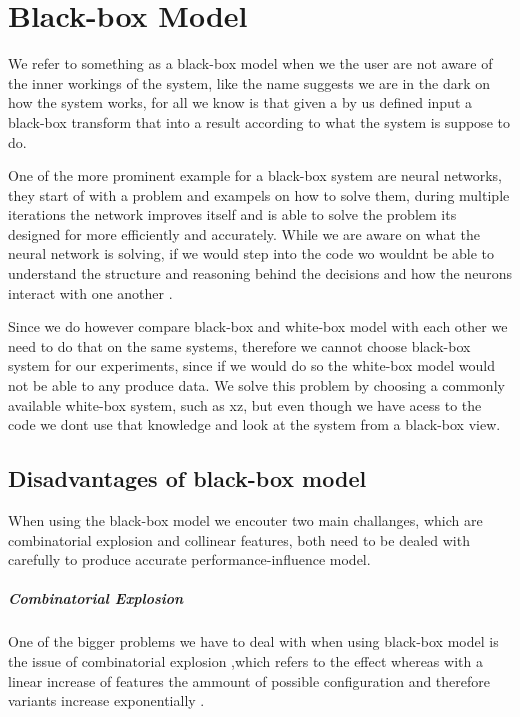 \chapter{Black-box Model}\label{ch:Blackbox}

We refer to something as a black-box model when we the user are not aware of the inner workings of the system, like the name suggests we are
in the dark on how the system works, for all we know is that given a by us defined input a black-box transform that into a result according to 
what the system is suppose to do. 

One of the more prominent example for a black-box system are neural networks, they start of with a problem
and exampels on how to solve them, during multiple iterations the network improves itself and is able to solve the problem its designed for
more efficiently and accurately. While we are aware on what the neural network is solving, if we would step into the
code wo wouldnt be able to understand the structure and reasoning behind the decisions and how the neurons interact with one another 
\cite{NeuralNetworks}.

Since we do however compare black-box and white-box model with each other we need to do that on the same systems, therefore
we cannot choose black-box system for our experiments, since if we would do so the white-box model would not be able to any produce data.
We solve this problem by choosing a commonly available white-box system, such as xz, but even though we have acess to the code we dont use
that knowledge and look at the system from a black-box view.

\section{Disadvantages of black-box model}
When using the black-box model we encouter two main challanges, which are combinatorial explosion and collinear features, both need to be
dealed with carefully to produce accurate performance-influence model.

\paragraph{Combinatorial Explosion}
One of the bigger problems we have to deal with when using black-box model is the issue of combinatorial explosion ,which refers to the
effect whereas with a linear increase of features the ammount of possible configuration and therefore variants increase exponentially 
\cite{Combinatorial-explosion}.

